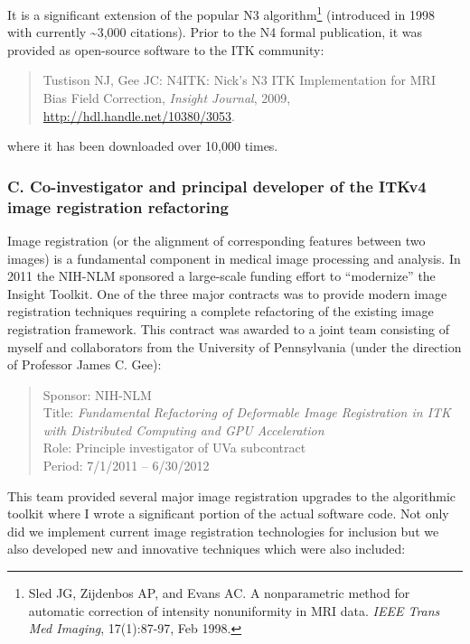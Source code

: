 \documentclass[11pt,]{article}
\let\rmarkdownfootnote\footnote%
\def\footnote{\protect\rmarkdownfootnote}
\begin{document}
It is a significant extension of the popular N3 algorithm\footnote{Sled
  JG, Zijdenbos AP, and Evans AC. A nonparametric method for automatic
  correction of intensity nonuniformity in MRI data. \emph{IEEE Trans
  Med Imaging}, 17(1):87-97, Feb 1998.} (introduced in 1998 with
currently \textasciitilde{}3,000 citations). Prior to the N4 formal
publication, it was provided as open-source software to the ITK
community:

\begin{quote}
Tustison NJ, Gee JC: N4ITK: Nick's N3 ITK Implementation for MRI Bias
Field Correction, \emph{Insight Journal}, 2009,
\url{http://hdl.handle.net/10380/3053}.
\end{quote}

where it has been downloaded over 10,000 times.

\subsubsection{C. Co-investigator and principal developer of the ITKv4
image registration
refactoring}\label{c.-co-investigator-and-principal-developer-of-the-itkv4-image-registration-refactoring}

Image registration (or the alignment of corresponding features between
two images) is a fundamental component in medical image processing and
analysis. In 2011 the NIH-NLM sponsored a large-scale funding effort to
``modernize'' the Insight Toolkit. One of the three major contracts was
to provide modern image registration techniques requiring a complete
refactoring of the existing image registration framework. This contract
was awarded to a joint team consisting of myself and collaborators from
the University of Pennsylvania (under the direction of Professor James
C. Gee):

\begin{quote}
Sponsor: NIH-NLM\\
Title: \emph{Fundamental Refactoring of Deformable Image Registration in
ITK with Distributed Computing and GPU Acceleration}\\
Role: Principle investigator of UVa subcontract\\
Period: 7/1/2011 -- 6/30/2012
\end{quote}

This team provided several major image registration upgrades to the
algorithmic toolkit where I wrote a significant portion of the actual
software code. Not only did we implement current image registration
technologies for inclusion but we also developed new and innovative
techniques which were also included:
\end{document}
